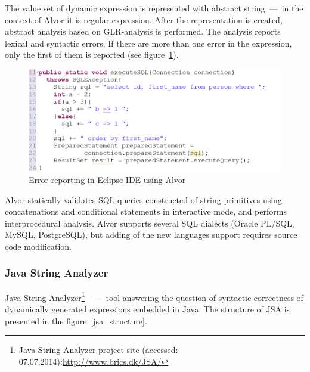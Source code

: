 \documentclass{acm_proc_article-sp}
\begin{document}
The value set of dynamic expression is represented with abstract string~---~in the context of Alvor it is regular expression. After the representation is created, abstract analysis based on GLR-analysis is performed. The analysis reports lexical and syntactic errors. If there are more than one error in the expression, only the first of them is reported (see figure~\ref{ex_alvor}).


\begin{figure}[h!]
    \begin{center}
        \includegraphics[scale=0.27]{graphics/ex_alvor.png}
    \end{center}
    \caption{Error reporting in Eclipse IDE using Alvor}
    \label{ex_alvor}
\end{figure}


Alvor statically validates SQL-queries constructed of string primitives using concatenations and conditional statements in interactive mode, and performs interprocedural analysis. Alvor supports several SQL dialects (Oracle PL/SQL, MySQL, PostgreSQL), but adding of the new languages support requires source code modification.\newline

\subsubsection{Java String Analyzer}

Java String Analyzer\footnote{Java String Analyzer project site (accessed: 07.07.2014):\url{http://www.brics.dk/JSA/}}~\cite{StringExpr}~---~tool answering the question of syntactic correctness of dynamically generated expressions embedded in Java. The structure of JSA is presented in the figure~\ref{jsa_structure}.
\end{document}
